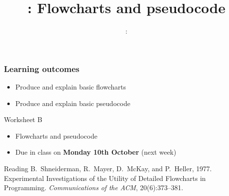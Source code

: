 \usepackage{../../beamerthemeFalmouthGamesAcademy}
\usepackage{multimedia}
\graphicspath{ {../../} }

\lstset{language=Python
}

\usepackage[normalem]{ulem}
\usepackage{wasysym}

\usepackage{algpseudocode}

\usepackage{pdfpages}

\usetikzlibrary{arrows,automata}




\title{\sessionnumber: Flowcharts and pseudocode}
\subtitle{\modulecode: \moduletitle}

\frame{\titlepage} 

\begin{frame}
	\frametitle{Learning outcomes}
	\begin{itemize}
		\item Produce and explain basic flowcharts
		\item Produce and explain basic pseudocode
	\end{itemize}
\end{frame}

\begin{frame}{Worksheet B}
	\begin{itemize}
		\item Flowcharts and pseudocode
		\item Due in class on \textbf{Monday 10th October} (next week)
	\end{itemize}
\end{frame}

\begin{frame}{Reading}
	B.\ Shneiderman, R.\ Mayer, D.\ McKay, and P.\ Heller, 1977.
	Experimental Investigations of the Utility of Detailed Flowcharts in Programming.
	\emph{Communications of the ACM},
	20(6):373--381.
\end{frame}







